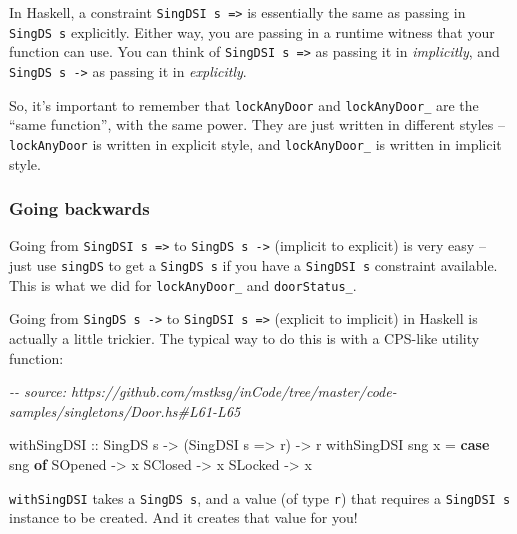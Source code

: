\documentclass[]{article}
\newenvironment{Shaded}{}{}
\newcommand{\CommentTok}[1]{\textcolor[rgb]{0.38,0.63,0.69}{\textit{#1}}}
\newcommand{\DataTypeTok}[1]{\textcolor[rgb]{0.56,0.13,0.00}{#1}}
\newcommand{\KeywordTok}[1]{\textcolor[rgb]{0.00,0.44,0.13}{\textbf{#1}}}
\newcommand{\NormalTok}[1]{#1}
\newcommand{\OtherTok}[1]{\textcolor[rgb]{0.00,0.44,0.13}{#1}}
\begin{document}
In Haskell, a constraint \texttt{SingDSI\ s\ =\textgreater{}} is essentially the
same as passing in \texttt{SingDS\ s} explicitly. Either way, you are passing in
a runtime witness that your function can use. You can think of
\texttt{SingDSI\ s\ =\textgreater{}} as passing it in \emph{implicitly}, and
\texttt{SingDS\ s\ -\textgreater{}} as passing it in \emph{explicitly}.

So, it's important to remember that \texttt{lockAnyDoor} and
\texttt{lockAnyDoor\_} are the ``same function'', with the same power. They are
just written in different styles -- \texttt{lockAnyDoor} is written in explicit
style, and \texttt{lockAnyDoor\_} is written in implicit style.

\hypertarget{going-backwards}{%
\subsubsection{Going backwards}\label{going-backwards}}

Going from \texttt{SingDSI\ s\ =\textgreater{}} to
\texttt{SingDS\ s\ -\textgreater{}} (implicit to explicit) is very easy -- just
use \texttt{singDS} to get a \texttt{SingDS\ s} if you have a
\texttt{SingDSI\ s} constraint available. This is what we did for
\texttt{lockAnyDoor\_} and \texttt{doorStatus\_}.

Going from \texttt{SingDS\ s\ -\textgreater{}} to
\texttt{SingDSI\ s\ =\textgreater{}} (explicit to implicit) in Haskell is
actually a little trickier. The typical way to do this is with a CPS-like
utility function:

\begin{Shaded}
\begin{Highlighting}[]
\CommentTok{{-}{-} source: https://github.com/mstksg/inCode/tree/master/code{-}samples/singletons/Door.hs\#L61{-}L65}

\OtherTok{withSingDSI ::} \DataTypeTok{SingDS}\NormalTok{ s }\OtherTok{{-}>}\NormalTok{ (}\DataTypeTok{SingDSI}\NormalTok{ s }\OtherTok{=>}\NormalTok{ r) }\OtherTok{{-}>}\NormalTok{ r}
\NormalTok{withSingDSI sng x }\OtherTok{=} \KeywordTok{case}\NormalTok{ sng }\KeywordTok{of}
    \DataTypeTok{SOpened} \OtherTok{{-}>}\NormalTok{ x}
    \DataTypeTok{SClosed} \OtherTok{{-}>}\NormalTok{ x}
    \DataTypeTok{SLocked} \OtherTok{{-}>}\NormalTok{ x}
\end{Highlighting}
\end{Shaded}

\texttt{withSingDSI} takes a \texttt{SingDS\ s}, and a value (of type
\texttt{r}) that requires a \texttt{SingDSI\ s} instance to be created. And it
creates that value for you!
\end{document}
